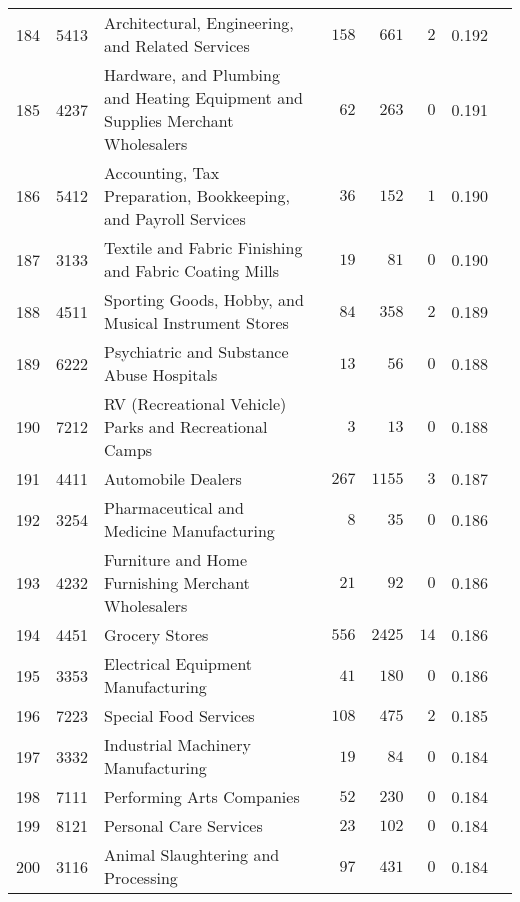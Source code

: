 \documentclass[9pt, oneside]{article}   	%
\begin{document}
\begin{longtable}{lcp{3 in}ccccc}
184  & 5413 & Architectural, Engineering, and Related Services & $\phantom{0}158$ & $\phantom{0}661$ & $\phantom{0}2$ & 0.192 \\
185  & 4237 & Hardware, and Plumbing and Heating Equipment and Supplies Merchant Wholesalers & $\phantom{00}62$ & $\phantom{0}263$ & $\phantom{0}0$ & 0.191 \\
186  & 5412 & Accounting, Tax Preparation, Bookkeeping, and Payroll Services & $\phantom{00}36$ & $\phantom{0}152$ & $\phantom{0}1$ & 0.190 \\
187  & 3133 & Textile and Fabric Finishing and Fabric Coating Mills & $\phantom{00}19$ & $\phantom{00}81$ & $\phantom{0}0$ & 0.190 \\
188  & 4511 & Sporting Goods, Hobby, and Musical Instrument Stores & $\phantom{00}84$ & $\phantom{0}358$ & $\phantom{0}2$ & 0.189 \\
189  & 6222 & Psychiatric and Substance Abuse Hospitals & $\phantom{00}13$ & $\phantom{00}56$ & $\phantom{0}0$ & 0.188 \\
190  & 7212 & RV (Recreational Vehicle) Parks and Recreational Camps & $\phantom{000}3$ & $\phantom{00}13$ & $\phantom{0}0$ & 0.188 \\
191  & 4411 & Automobile Dealers & $\phantom{0}267$ & $1155$ & $\phantom{0}3$ & 0.187 \\
192  & 3254 & Pharmaceutical and Medicine Manufacturing & $\phantom{000}8$ & $\phantom{00}35$ & $\phantom{0}0$ & 0.186 \\
193  & 4232 & Furniture and Home Furnishing Merchant Wholesalers & $\phantom{00}21$ & $\phantom{00}92$ & $\phantom{0}0$ & 0.186 \\
194  & 4451 & Grocery Stores & $\phantom{0}556$ & $2425$ & $14$ & 0.186 \\
195  & 3353 & Electrical Equipment Manufacturing & $\phantom{00}41$ & $\phantom{0}180$ & $\phantom{0}0$ & 0.186 \\
196  & 7223 & Special Food Services & $\phantom{0}108$ & $\phantom{0}475$ & $\phantom{0}2$ & 0.185 \\
197  & 3332 & Industrial Machinery Manufacturing & $\phantom{00}19$ & $\phantom{00}84$ & $\phantom{0}0$ & 0.184 \\
198  & 7111 & Performing Arts Companies & $\phantom{00}52$ & $\phantom{0}230$ & $\phantom{0}0$ & 0.184 \\
199  & 8121 & Personal Care Services & $\phantom{00}23$ & $\phantom{0}102$ & $\phantom{0}0$ & 0.184 \\
200  & 3116 & Animal Slaughtering and Processing & $\phantom{00}97$ & $\phantom{0}431$ & $\phantom{0}0$ & 0.184 \\

\end{longtable}
\end{document}
